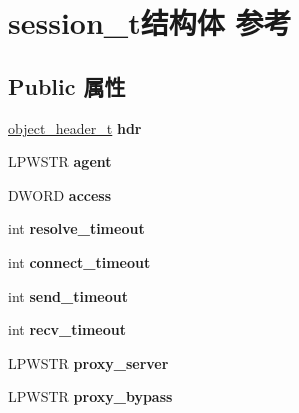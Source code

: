 \hypertarget{structsession__t}{}\section{session\+\_\+t结构体 参考}
\label{structsession__t}
\subsection*{Public 属性}
\begin{DoxyCompactItemize}
\item 
\mbox{\label{structsession__t_ac60067a73ad10ce639e415c44a4c8a16}} 
\hyperlink{struct__object__header__t}{object\+\_\+header\+\_\+t} {\bfseries hdr}
\item 
\mbox{\label{structsession__t_acfc7a30ff0e72717c21930f371ee7799}} 
L\+P\+W\+S\+TR {\bfseries agent}
\item 
\mbox{\label{structsession__t_ade212ac135ecc592d5c8970d5d7835c9}} 
D\+W\+O\+RD {\bfseries access}
\item 
\mbox{\label{structsession__t_a9689ce08a4aacd06782b7028a7371705}} 
int {\bfseries resolve\+\_\+timeout}
\item 
\mbox{\label{structsession__t_a45bad76766af7f45dfbc04d9edad28bc}} 
int {\bfseries connect\+\_\+timeout}
\item 
\mbox{\label{structsession__t_ab0c3ba86ddf8c7da61b490521ec4be26}} 
int {\bfseries send\+\_\+timeout}
\item 
\mbox{\label{structsession__t_a15c8c1d499b5f613c67c08eff857a74d}} 
int {\bfseries recv\+\_\+timeout}
\item 
\mbox{\label{structsession__t_a9a114af8e453df1bb791c3c8c339c01d}} 
L\+P\+W\+S\+TR {\bfseries proxy\+\_\+server}
\item 
\mbox{\label{structsession__t_a36032283d87315fa87b7679c7813b6fa}} 
L\+P\+W\+S\+TR {\bfseries proxy\+\_\+bypass}
\item 
\mbox{\label{structsession__t_aaa82786bf3ba6c79dd350517cddabae5}} 

\end{DoxyCompactItemize}
